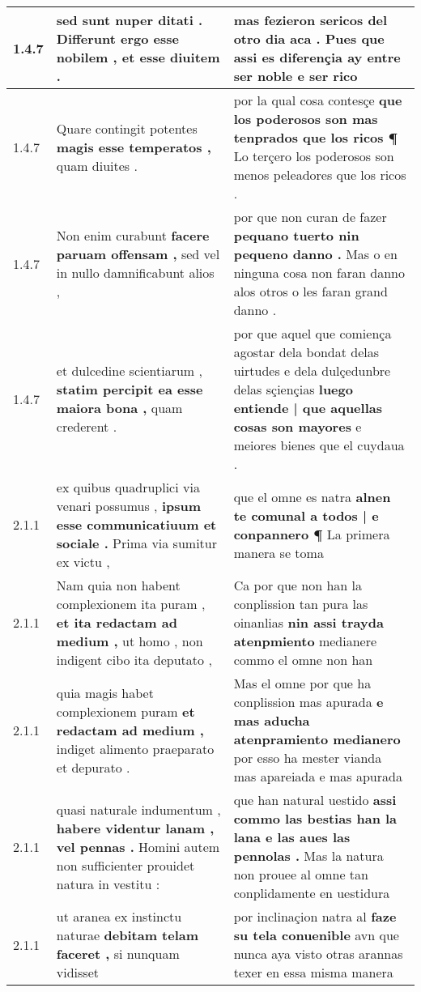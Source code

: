 \begin{tabular}{|p{1cm}|p{6.5cm}|p{6.5cm}|}
1.4.7 & sed sunt nuper ditati . \textbf{ Differunt ergo esse nobilem , } et esse diuitem . & mas fezieron sericos del otro dia aca . \textbf{ Pues que assi es diferençia ay } entre ser noble e ser rico \\\hline
1.4.7 & Quare contingit potentes \textbf{ magis esse temperatos , } quam diuites . & por la qual cosa contesçe \textbf{ que los poderosos son mas tenprados que los ricos ¶ } Lo terçero los poderosos son menos peleadores que los ricos . \\\hline
1.4.7 & Non enim curabunt \textbf{ facere paruam offensam , } sed vel in nullo damnificabunt alios , & por que non curan de fazer \textbf{ pequano tuerto nin pequeno danno . } Mas o en ninguna cosa non faran danno alos otros o les faran grand danno . \\\hline
1.4.7 & et dulcedine scientiarum , \textbf{ statim percipit ea esse maiora bona , } quam crederent . & por que aquel que comiença agostar dela bondat delas uirtudes e dela dulçedunbre delas sçiençias \textbf{ luego entiende | que aquellas cosas son mayores } e meiores bienes que el cuydaua . \\\hline
2.1.1 & ex quibus quadruplici via venari possumus , \textbf{ ipsum esse communicatiuum et sociale . } Prima via sumitur ex victu , & que el omne es natra \textbf{ alnen te comunal a todos | e conpannero ¶ } La primera manera se toma \\\hline
2.1.1 & Nam quia non habent complexionem ita puram , \textbf{ et ita redactam ad medium , } ut homo , non indigent cibo ita deputato , & Ca por que non han la conplission tan pura las oinanlias \textbf{ nin assi trayda atenpmiento } medianere commo el omne non han \\\hline
2.1.1 & quia magis habet complexionem puram \textbf{ et redactam ad medium , } indiget alimento praeparato et depurato . & Mas el omne por que ha conplission mas apurada \textbf{ e mas aducha atenpramiento medianero } por esso ha mester vianda mas apareiada e mas apurada \\\hline
2.1.1 & quasi naturale indumentum , \textbf{ habere videntur lanam , vel pennas . } Homini autem non sufficienter prouidet natura in vestitu : & que han natural uestido \textbf{ assi commo las bestias han la lana e las aues las pennolas . } Mas la natura non prouee al omne tan conplidamente en uestidura \\\hline
2.1.1 & ut aranea ex instinctu naturae \textbf{ debitam telam faceret , } si nunquam vidisset & por inclinaçion natra al \textbf{ faze su tela conuenible } avn que nunca aya visto otras arannas texer en essa misma manera \\\hline

\end{tabular}

